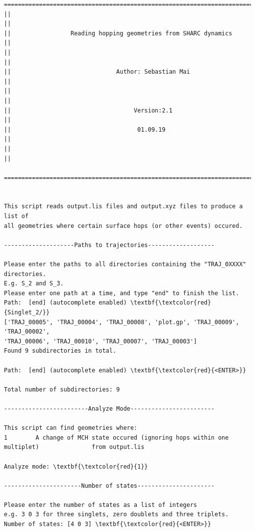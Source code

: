 \documentclass[a4paper,11pt,DIV=15,openany]{scrbook}
\begin{document}
\begin{oframed}
\footnotesize\begin{Verbatim}[commandchars=\\\{\}]
  ================================================================================
||                                                                                ||
||                 Reading hopping geometries from SHARC dynamics                 ||
||                                                                                ||
||                              Author: Sebastian Mai                             ||
||                                                                                ||
||                                   Version:2.1                                  ||
||                                    01.09.19                                    ||
||                                                                                ||
  ================================================================================


This script reads output.lis files and output.xyz files to produce a list of
all geometries where certain surface hops (or other events) occured.

--------------------Paths to trajectories-------------------

Please enter the paths to all directories containing the "TRAJ_0XXXX" directories.
E.g. S_2 and S_3.
Please enter one path at a time, and type "end" to finish the list.
Path:  [end] (autocomplete enabled) \textbf{\textcolor{red}{Singlet_2/}}
['TRAJ_00005', 'TRAJ_00004', 'TRAJ_00008', 'plot.gp', 'TRAJ_00009', 'TRAJ_00002', 
'TRAJ_00006', 'TRAJ_00010', 'TRAJ_00007', 'TRAJ_00003']
Found 9 subdirectories in total.

Path:  [end] (autocomplete enabled) \textbf{\textcolor{red}{<ENTER>}}

Total number of subdirectories: 9

------------------------Analyze Mode------------------------

This script can find geometries where:
1        A change of MCH state occured (ignoring hops within one multiplet)               from output.lis

Analyze mode: \textbf{\textcolor{red}{1}}

----------------------Number of states----------------------

Please enter the number of states as a list of integers
e.g. 3 0 3 for three singlets, zero doublets and three triplets.
Number of states: [4 0 3] \textbf{\textcolor{red}{<ENTER>}}



\end{Verbatim}
\end{oframed}
\end{document}
